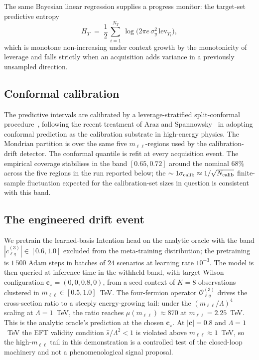 \documentclass[11pt,a4paper]{article}
\newcommand{\Lam}{\Lambda}
\newcommand{\mll}{m_{\ell\ell}}
\begin{document}
The same Bayesian linear regression supplies a progress monitor: the target-set predictive entropy
\begin{equation}
  H_T \;=\; \frac{1}{2}\,\sum_{i=1}^{N_T}\,\log\!\bigl(2\pi e\, \sigma_y^2\, \mathrm{lev}_{T_i}\bigr),
  \label{eq:ht}
\end{equation}
which is monotone non-increasing under context growth by the monotonicity of leverage and falls strictly when an acquisition adds variance in a previously unsampled direction.

\subsection{Conformal calibration}
\label{sec:conformal}

The predictive intervals are calibrated by a leverage-stratified split-conformal procedure~\cite{Lei:2018conformal,Vovk:2005alg}, following the recent treatment of Araz and Spannowsky~\cite{Araz:2025conformal} in adopting conformal prediction as the calibration substrate in high-energy physics. The Mondrian partition is over the same five $\mll$-regions used by the calibration-drift detector. The conformal quantile is refit at every acquisition event. The empirical coverage stabilises in the band $[0.65, 0.72]$ around the nominal $68\%$ across the five regions in the run reported below; the $\sim 1\sigma_{\rm calib} \approx 1/\sqrt{N_{\rm calib}}$ finite-sample fluctuation expected for the calibration-set sizes in question is consistent with this band.

\subsection{The engineered drift event}
\label{sec:engineered}

We pretrain the learned-basis Intention head on the analytic oracle with the band $|c_{\ell q}^{(3)}| \in [0.6, 1.0]$ excluded from the meta-training distribution; the pretraining is $1\,500$ Adam steps in batches of $24$ scenarios at learning rate $10^{-3}$. The model is then queried at inference time in the withheld band, with target Wilson configuration $\bm{c}_\star = (0, 0, 0.8, 0)$, from a seed context of $K = 8$ observations clustered in $\mll \in [0.5, 1.0]$~TeV. The four-fermion operator $\mathcal{O}_{\ell q}^{(3)}$ drives the cross-section ratio to a steeply energy-growing tail: under the $(\mll / \Lam)^4$ scaling at $\Lam = 1$~TeV, the ratio reaches $\mu(\mll) \approx 870$ at $\mll = 2.25$~TeV. This is the analytic oracle's prediction at the chosen $\bm{c}_\star$. At $|\bm{c}| = 0.8$ and $\Lam = 1$~TeV the EFT validity condition $\hat{s} / \Lam^2 < 1$ is violated above $\mll \approx 1$~TeV, so the high-$\mll$ tail in this demonstration is a controlled test of the closed-loop machinery and not a phenomenological signal proposal.
\end{document}
